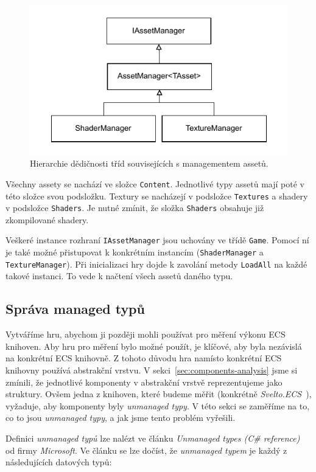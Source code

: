 \begin{figure}[!htb]
  \centering
  \includegraphics[width=0.6\linewidth]{img/asset-manager.pdf}
  \caption{Hierarchie dědičnosti tříd souvisejících s managementem assetů.}
  \label{fig:asset-manager}
\end{figure}

Všechny assety se nachází ve složce \texttt{Content}. Jednotlivé typy assetů mají poté v této složce svou podsložku. Textury se nacházejí v podsložce \texttt{Textures} a shadery v podsložce \texttt{Shaders}. Je nutné zmínit, že složka \texttt{Shaders} obsahuje již zkompilované shadery.

Veškeré instance rozhraní \texttt{IAssetManager} jsou uchovány ve třídě \texttt{Game}. Pomocí ní je také možné přistupovat k konkrétním instancím (\texttt{ShaderManager} a \texttt{TextureManager}). Při inicializaci hry dojde k zavolání metody \texttt{LoadAll} na každé takové instanci. To vede k načtení všech assetů daného typu.

\subsection{Správa managed typů}
Vytváříme hru, abychom ji později mohli používat pro měření výkonu ECS knihoven. Aby hru pro měření bylo možné použít, je klíčové, aby byla nezávislá na konkrétní ECS knihovně. Z tohoto důvodu hra namísto konkrétní ECS knihovny používá abstrakční vrstvu. V sekci~\ref{sec:components-analysis} jsme si zmínili, že jednotlivé komponenty v abstrakční vrstvě reprezentujeme jako struktury. Ovšem jedna z knihoven, které budeme měřit (konkrétně \textit{Svelto.ECS}~\cite{SveltoECS}), vyžaduje, aby komponenty byly \textit{unmanaged typy}. V této sekci se zaměříme na to, co to jsou \textit{unmanaged typy}, a jak jsme tento problém vyřešili.

Definici \textit{unmanaged typů} lze nalézt ve článku \textit{Unmanaged types (C\# reference)}~\cite{Unmanagedtypes} od firmy \textit{Microsoft}. Ve článku se lze dočíst, že \textit{unmanaged typem} je každý z následujících datových typů:

